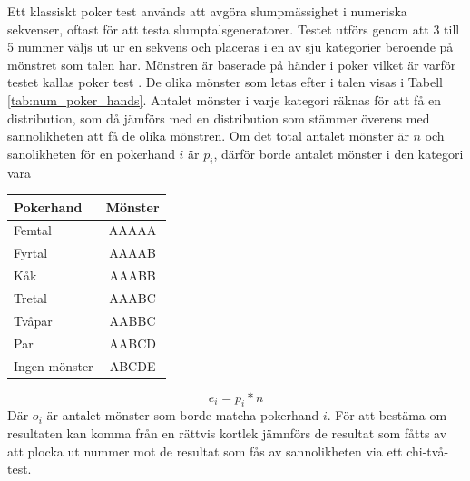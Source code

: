 \documentclass[swedish,a4paper]{article}
\begin{document}

\noindent
\begin{minipage}[t]{0.6\textwidth}
Ett klassiskt poker test används att avgöra slump\-mässighet i numeriska 
sekvenser, oftast för att testa slumptalsgeneratorer. Testet utförs genom
att 3 till 5 nummer väljs ut ur en sekvens och placeras i en av sju
kategorier beroende på mönstret som talen har.  Mönstren är baserade på händer i poker vilket är varför testet kallas poker test \parencite{Abdel2014}. 
De olika mönster som letas efter i talen visas i Tabell \ref{tab:num_poker_hands}.
\indent
 Antalet mönster i varje kategori räknas för att få en distribution, som
 då jämförs med en distribution som stämmer överens med sannolikheten
 att få de olika mönstren. Om det total antalet mönster är $n$ och
 sanolikheten för en pokerhand $i$ är $p_i$, därför borde antalet mönster i
 den kategori vara 
\end{minipage}%
\hfill
\begin{minipage}[t]{0.40\textwidth}
	\centering
	\captionsetup{width=0.5\textwidth}
    \label{tab:num_poker_hands}
	\begin{tabular}{|l|c|}
	\hline 
	Pokerhand & Mönster \\ \hline  
	Femtal & AAAAA \\ \hline
	Fyrtal & AAAAB \\ \hline
	Kåk & AAABB \\ \hline
	Tretal & AAABC \\ \hline
	Tvåpar & AABBC \\ \hline
	Par & AABCD \\ \hline
    	Ingen mönster & ABCDE \\ \hline
	
\end{tabular}
%
\end{minipage}
$$e_i = p_i * n$$
 Där $o_i$ är antalet mönster som
 borde matcha pokerhand $i$. För att bestäma om resultaten kan komma
 från en rättvis kortlek jämnförs de resultat som fåtts av att plocka
 ut nummer mot de resultat som fås av sannolikheten via ett chi-två-test.
\end{document}
